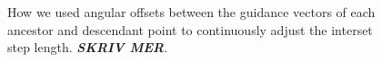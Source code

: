 \begin{figure}[htpb]
    \centering
    \resizebox{0.9\linewidth}{!}{}
    \caption[How we used angular offsets between the guidance vectors of
    each ancestor and descendant point to continuously adjust the interset step]
    {How we used angular offsets between the guidance vectors of each ancestor
    and descendant point to continuously adjust the interset step length.
    \emph{\textbf{SKRIV MER}}.
}
    \label{fig:angular_adjustment}
\end{figure}
